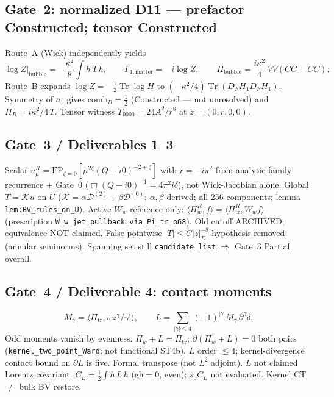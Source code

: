 \subsection{Gate~2: normalized D11 --- prefactor Constructed; tensor Constructed}
Route~A (Wick) independently yields
\[
\log Z\big|_{\mathrm{bubble}}=-\frac{\kappa^2}{8}\int h\,T\,h,\qquad
\Gamma_{1,\mathrm{matter}}=-i\log Z,\qquad
\Pi_{\mathrm{bubble}}=\frac{i\kappa^2}{4}\,VV(CC+CC).
\]
Route~B expands $\log Z=-\tfrac12\operatorname{Tr}\log H$ to
$(-\kappa^2/4)\operatorname{Tr}(D_FH_1D_FH_1)$. Symmetry of $a_1$ gives
$\mathrm{comb}_B=\tfrac12$ (Constructed --- not unresolved) and
$\Pi_B=i\kappa^2/4\,T$. Tensor witness $T_{0000}=24A^2/r^8$ at $z=(0,r,0,0)$.

\subsection{Gate~3 / Deliverables 1--3}
Scalar $u_\mu^R=\mathrm{FP}_{\zeta=0}[\mu^{2\zeta}(Q-i0)^{-2+\zeta}]$ with
$r=-i\pi^2$ from analytic-family recurrence + Gate~0
($\Box(Q-i0)^{-1}=4\pi^2 i\delta$), not Wick-Jacobian alone.
Global $T=\mathcal K u$ on $U$
($\mathcal K=\alpha\mathcal D^{(2)}+\beta\mathcal D^{(0)}$; $\alpha,\beta$ derived;
all 256 components; lemma \texttt{lem:BV\_rules\_on\_U}).
Active $W_w$ reference only:
$\langle\Pi_w^R,f\rangle=\langle\Pi_{\mathrm{tr}}^R,W_wf\rangle$
(prescription \texttt{W\_w\_jet\_pullback\_via\_Pi\_tr\_o68}).
Old cutoff ARCHIVED; equivalence NOT claimed.
False pointwise $|T|\le C|z|_E^{-8}$ hypothesis removed (annular seminorms).
Spanning set still \texttt{candidate\_list} $\Rightarrow$ Gate~3 Partial overall.

\subsection{Gate~4 / Deliverable 4: contact moments}
\[
M_\gamma=\langle\Pi_{\mathrm{tr}},w z^\gamma/\gamma!\rangle,\qquad
L=\sum_{|\gamma|\le4}(-1)^{|\gamma|}M_\gamma\,\partial^\gamma\delta.
\]
Odd moments vanish by evenness. $\Pi_w+L=\Pi_{\mathrm{tr}}$;
$\partial(\Pi_w+L)=0$ both pairs
(\texttt{kernel\_two\_point\_Ward}; not functional ST4b).
$L$ order $\le4$; kernel-divergence contact bound on $\partial L$ is five.
Formal transpose (not $L^2$ adjoint). $L$ not claimed Lorentz covariant.
$C_L=\tfrac12\int h\,L\,h$ (gh$=0$, even); $s_0C_L$ not evaluated.
Kernel CT $\ne$ bulk BV restore.
